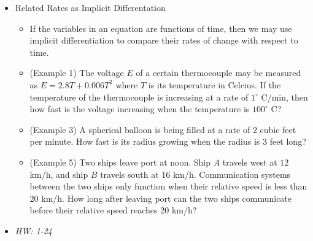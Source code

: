 \documentclass[11pt]{article}
\begin{document}
\begin{itemize}
\item Related Rates as Implicit Differentation
  \begin{itemize}
    \item If the variables in an equation are functions of time, then
          we may use implicit differentiation to compare their rates of
          change with respect to time.
    \item (Example 1) The voltage \(E\) of a certain thermocouple may
          be measured as \(E=2.8T+0.006 T^2\) where \(T\) is its temperature
          in Celcius. If the temperature of the thermocouple is increasing
          at a rate of \(1^\circ\) C/min, then how fast is the voltage
          increasing when the temperature is \(100^\circ\) C?
    \item (Example 3) A spherical balloon is being filled at a rate of
          \(2\) cubic feet per minute. How fast is its radius growing
          when the radius is \(3\) feet long?
    \item (Example 5) Two ships leave port at noon. Ship \(A\) travels
          west at \(12\) km/h, and ship \(B\) travels south at \(16\) km/h.
          Communication systems between the two ships only function when
          their relative speed is less than \(20\) km/h. How long after leaving
          port can the two ships communicate before their relative speed
          reaches \(20\) km/h?
  \end{itemize}
\item\textit{
  HW: 1-24
}
\end{itemize}

\end{document}
